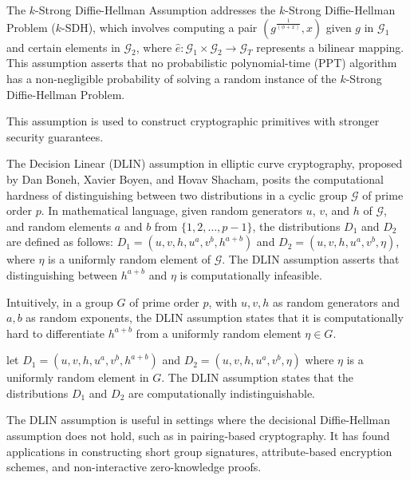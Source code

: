 \documentclass{iacrtrans}
\begin{document}
\begin{definition}
	The $k$-Strong Diffie-Hellman Assumption addresses the $k$-Strong Diffie-Hellman Problem ($k$-SDH), which involves computing a pair $(g^{\frac{1}{(\phi+x)}}, x)$ given $g$ in $\mathcal{G}_1$ and certain elements in $\mathcal{G}_2$, where $\hat{e}: \mathcal{G}_1 \times \mathcal{G}_2 \rightarrow \mathcal{G}_T$ represents a bilinear mapping. This assumption asserts that no probabilistic polynomial-time (PPT) algorithm has a non-negligible probability of solving a random instance of the $k$-Strong Diffie-Hellman Problem.
\end{definition}

This assumption is used to construct cryptographic primitives with stronger security guarantees.

The Decision Linear (DLIN) assumption in elliptic curve cryptography, proposed by Dan Boneh, Xavier Boyen, and Hovav Shacham, posits the computational hardness of distinguishing between two distributions in a cyclic group \(\mathcal{G}\) of prime order \(p\). In mathematical language, given random generators \(u\), \(v\), and \(h\) of \(\mathcal{G}\), and random elements \(a\) and \(b\) from \(\{1, 2, \ldots, p-1\}\), the distributions \(D_{1}\) and \(D_{2}\) are defined as follows: \(D_{1} = (u, v, h, u^{a}, v^{b}, h^{a+b})\) and \(D_{2} = (u, v, h, u^{a}, v^{b}, \eta)\), where \(\eta\) is a uniformly random element of \(\mathcal{G}\). The DLIN assumption asserts that distinguishing between \(h^{a+b}\) and \(\eta\) is computationally infeasible.

Intuitively, in a group \(G\) of prime order \(p\), with \(u, v, h\) as random generators and \(a, b\) as random exponents, the DLIN assumption states that it is computationally hard to differentiate \(h^{a+b}\) from a uniformly random element \(\eta \in G\).

\begin{definition}
	let $D_1 = (u, v, h, u^a, v^b, h^{a+b})$ and $D_2 = (u, v, h, u^a, v^b, \eta)$ where $\eta$ is a uniformly random element in $G$. The DLIN assumption states that the distributions $D_1$ and $D_2$ are computationally indistinguishable.
\end{definition}

The DLIN assumption is useful in settings where the decisional Diffie-Hellman assumption does not hold, such as in pairing-based cryptography. It has found applications in constructing short group signatures, attribute-based encryption schemes, and non-interactive zero-knowledge proofs.
\end{document}
